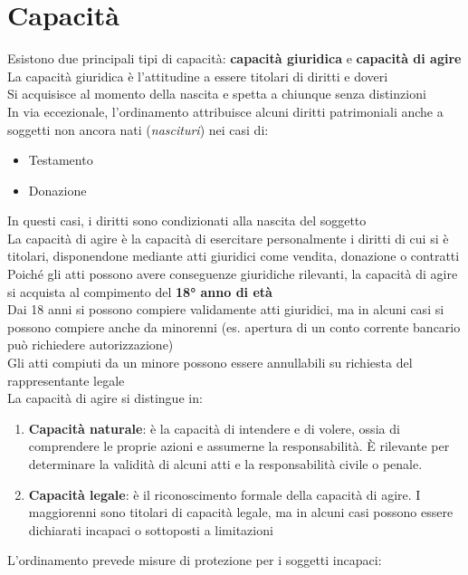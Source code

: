 \documentclass[10pt,oneside,a4paper]{article}
\begin{document}
	\section{Capacità}
	Esistono due principali tipi di capacità: \textbf{capacità giuridica} e \textbf{capacità di agire}\\
	La capacità giuridica è l'attitudine a essere titolari di diritti e doveri\\
	Si acquisisce al momento della nascita e spetta a chiunque senza distinzioni\\
	In via eccezionale, l'ordinamento attribuisce alcuni diritti patrimoniali anche a soggetti non ancora nati (\textit{nascituri}) nei casi di:  
	\begin{itemize}
		\item Testamento  
		\item Donazione  
	\end{itemize}
	In questi casi, i diritti sono condizionati alla nascita del soggetto\\
	La capacità di agire è la capacità di esercitare personalmente i diritti di cui si è titolari, disponendone mediante atti giuridici come vendita, donazione o contratti\\
	Poiché gli atti possono avere conseguenze giuridiche rilevanti, la capacità di agire si acquista al compimento del \textbf{18° anno di età}\\
	Dai 18 anni si possono compiere validamente atti giuridici, ma in alcuni casi si possono compiere anche da minorenni (es. apertura di un conto corrente bancario può richiedere autorizzazione)\\
	Gli atti compiuti da un minore possono essere annullabili su richiesta del rappresentante legale\\
	La capacità di agire si distingue in:  
	\begin{enumerate}
		\item \textbf{Capacità naturale}: è la capacità di intendere e di volere, ossia di comprendere le proprie azioni e assumerne la responsabilità. È rilevante per determinare la validità di alcuni atti e la responsabilità civile o penale. 
		\item \textbf{Capacità legale}: è il riconoscimento formale della capacità di agire. I maggiorenni sono titolari di capacità legale, ma in alcuni casi possono essere dichiarati incapaci o sottoposti a limitazioni
	\end{enumerate}
	L'ordinamento prevede misure di protezione per i soggetti incapaci:  
\end{document}
